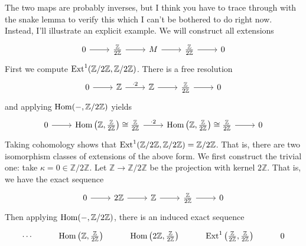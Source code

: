 \documentclass[../../master.tex]{subfiles}
\begin{document}
\begin{solution}
    The two maps are probably inverses, but I think you have to trace through with the snake lemma to verify this which I can't be bothered to do right now.
    Instead, I'll illustrate an explicit example.
    We will construct all extensions
    \[
    \begin{tikzcd}
        0 & \frac{\mathbb{Z}}{2\mathbb{Z}} & M & \frac{\mathbb{Z}}{2\mathbb{Z}} & 0
        \arrow[from=1-1, to=1-2]
        \arrow[from=1-2, to=1-3]
        \arrow[from=1-3, to=1-4]
        \arrow[from=1-4, to=1-5] 
    \end{tikzcd}
    \]
    First we compute $\operatorname{Ext}^{1}(\mathbb{Z}/2\mathbb{Z}, \mathbb{Z}/2\mathbb{Z})$.
    There is a free resolution
    \[
    \begin{tikzcd}
        0 & \mathbb{Z} & \mathbb{Z} & \frac{\mathbb{Z}}{2\mathbb{Z}} & 0
        \arrow[from=1-1, to=1-2]
        \arrow[from=1-2, to=1-3, "\cdot 2"]
        \arrow[from=1-3, to=1-4]
        \arrow[from=1-4, to=1-5] 
    \end{tikzcd}
    \]
    and applying $\operatorname{Hom}(-, \mathbb{Z}/2\mathbb{Z})$ yields
    \[
    \begin{tikzcd}
        0 & \Hom\left(\mathbb{Z}, \frac{\mathbb{Z}}{2\mathbb{Z}}\right) \cong \frac{\mathbb{Z}}{2\mathbb{Z}} & \Hom\left(\mathbb{Z}, \frac{\mathbb{Z}}{2\mathbb{Z}}\right) \cong \frac{\mathbb{Z}}{2\mathbb{Z}} & 0
        \arrow[from=1-1, to=1-2]
        \arrow[from=1-2, to=1-3, "\cdot 2"]
        \arrow[from=1-3, to=1-4]
    \end{tikzcd}
    \]
    Taking cohomology shows that $\operatorname{Ext}^{1}(\mathbb{Z}/2\mathbb{Z}, \mathbb{Z}/2\mathbb{Z}) = \mathbb{Z}/2\mathbb{Z}$.
    That is, there are two isomorphism classes of extensions of the above form.
    We first construct the trivial one:
    take $\kappa = 0 \in \mathbb{Z}/2\mathbb{Z}$.
    Let $\mathbb{Z} \to \mathbb{Z}/2\mathbb{Z}$ be the projection with kernel $2\mathbb{Z}$.
    That is, we have the exact sequence
    \[
    \begin{tikzcd}
        0 & 2\mathbb{Z} & \mathbb{Z} & \frac{\mathbb{Z}}{2\mathbb{Z}} & 0
        \arrow[from=1-1, to=1-2]
        \arrow[from=1-2, to=1-3]
        \arrow[from=1-3, to=1-4]
        \arrow[from=1-4, to=1-5] 
    \end{tikzcd}
    \]
    Then applying $\operatorname{Hom}(-, \mathbb{Z}/2\mathbb{Z})$, there is an induced exact sequence
    \[
    \begin{tikzcd}
        \cdots & \Hom\left(\mathbb{Z}, \frac{\mathbb{Z}}{2\mathbb{Z}}\right) & \Hom\left(2\mathbb{Z}, \frac{\mathbb{Z}}{2\mathbb{Z}}\right) & \Ext^{1}\left(\frac{\mathbb{Z}}{2\mathbb{Z}}, \frac{\mathbb{Z}}{2\mathbb{Z}}\right) & 0

\end{tikzcd}\]
\end{solution}
\end{document}
